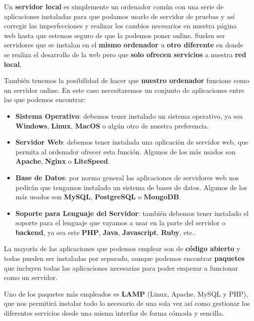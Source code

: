 Un \textbf{servidor local} es simplemente un ordenador común con una serie de aplicaciones instaladas para que podamos usarlo de servidor de pruebas y así corregir las imperfecciones y realizar los cambios necesarios en nuestra página web hasta que estemos seguro de que la podemos poner online. Suelen ser servidores que se instalan en el \textbf{mismo ordenador} u \textbf{otro diferente} en donde se realiza el desarrollo de la web pero que \textbf{solo ofrecen servicios} a nuestra \textbf{red local}.

También tenemos la posibilidad de hacer que \textbf{nuestro ordenador} funcione como un servidor online. En este caso necesitaremos un conjunto de aplicaciones entre las que podemos encontrar:

\begin{itemize}
    \item \textbf{Sistema Operativo}: debemos tener instalado un sistema operativo, ya sea \textbf{Windows}, \textbf{Linux}, \textbf{MacOS} o algún otro de nuestra preferencia.
    \item \textbf{Servidor Web}: debemos tener instalada una aplicación de servidor web, que permita al ordenador ofrecer esta función. Algunos de los más usados son \textbf{Apache}, \textbf{Nginx} o \textbf{LiteSpeed}.
    \item \textbf{Base de Datos}: por norma general las aplicaciones de servidores web nos pedirán que tengamos instalado un sistema de bases de datos. Algunos de los más usados son \textbf{MySQL}, \textbf{PostgreSQL} o \textbf{MongoDB}.
    \item \textbf{Soporte para Lenguaje del Servidor}: también debemos tener instalado el soporte para el lenguaje que vayamos a usar en la parte del servidor o \textbf{backend}, ya sea este \textbf{PHP}, \textbf{Java}, \textbf{Javascript}, \textbf{Ruby}, etc..
\end{itemize}

La mayoría de las aplicaciones que podemos emplear son de \textbf{código abierto} y todas pueden ser instaladas por separado, aunque podemos encontrar \textbf{paquetes} que incluyen todas las aplicaciones necesarias para poder empezar a funcionar como un servidor.

Uno de los paquetes más empleados es \textbf{LAMP} (Linux, Apache, MySQL y PHP), que nos permitirá instalar todo lo necesario de una sola vez así como gestionar los diferentes servicios desde una misma interfaz de forma cómoda y sencilla.



\glsaddall
\printglossaries


\newpage
{}



